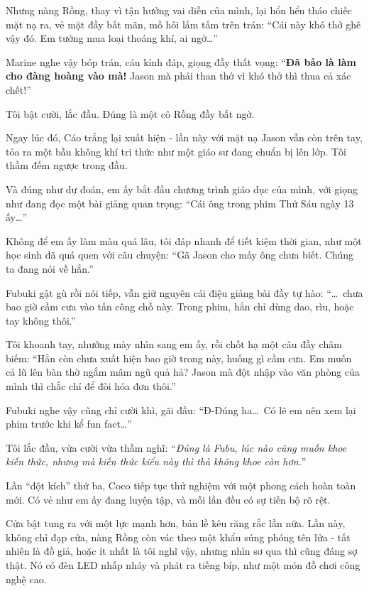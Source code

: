 \documentclass[../main.tex]{subfiles}
\begin{document}
Nhưng nàng Rồng, thay vì tận hưởng vai diễn của mình, lại hổn hển tháo chiếc mặt nạ ra, vẻ mặt đầy bất mãn, mồ hôi lấm tấm trên trán: ``Cái này khó thở ghê vậy đó. Em tưởng mua loại thoáng khí, ai ngờ\dots''

Marine nghe vậy bóp trán, cáu kỉnh đáp, giọng đầy thất vọng: ``\textbf{Đã bảo là làm cho đàng hoàng vào mà!} Jason mà phải than thở vì khó thở thì thua cả xác chết!''

Tôi bật cười, lắc đầu. Đúng là một cô Rồng đầy bất ngờ.

\il

Ngay lúc đó, Cáo trắng lại xuất hiện - lần này với mặt nạ Jason vẫn còn trên tay, tỏa ra một bầu không khí tri thức như một giáo sư đang chuẩn bị lên lớp. Tôi thầm đếm ngược trong đầu.

Và đúng như dự đoán, em ấy bắt đầu chương trình giáo dục của mình, với giọng như đang đọc một bài giảng quan trọng: ``Cái ông trong phim Thứ Sáu ngày 13 ấy\dots''


Không để em ấy làm màu quá lâu, tôi đáp nhanh để tiết kiệm thời gian, như một học sinh đã quá quen với câu chuyện: ``Gã Jason cho mấy ông chưa biết. Chúng ta đang nói về hắn.''

Fubuki gật gù rồi nói tiếp, vẫn giữ nguyên cái điệu giảng bài đầy tự hào: ``\dots\ chưa bao giờ cầm cưa vào tấn công chỗ này. Trong phim, hắn chỉ dùng dao, rìu, hoặc tay không thôi.''

Tôi khoanh tay, nhướng mày nhìn sang em ấy, rồi chốt hạ một câu đầy châm biếm: ``Hắn còn chưa xuất hiện bao giờ trong này, huống gì cầm cưa. Em muốn cả lũ lên bàn thờ ngắm mâm ngũ quả hả? Jason mà đột nhập vào văn phòng của mình thì chắc chỉ để đòi hóa đơn thôi.''

Fubuki nghe vậy cũng chỉ cười khì, gãi đầu: ``Đ-Đúng ha\dots\ Có lẽ em nên xem lại phim trước khi kể fun fact\dots''

Tôi lắc đầu, vừa cười vừa thầm nghĩ: ``\textit{Đúng là Fubu, lúc nào cũng muốn khoe kiến thức, nhưng mà kiến thức kiểu này thì thà không khoe còn hơn.}''

\il

\ct

Lần ``đột kích'' thứ ba, Coco tiếp tục thử nghiệm với một phong cách hoàn toàn mới. Có vẻ như em ấy đang luyện tập, và mỗi lần đều có sự tiến bộ rõ rệt.

Cửa bật tung ra với một lực mạnh hơn, bản lề kêu răng rắc lần nữa. Lần này, không chỉ đạp cửa, nàng Rồng còn vác theo một khẩu súng phóng tên lửa - tất nhiên là đồ giả, hoặc ít nhất là tôi nghĩ vậy, nhưng nhìn sơ qua thì cũng đáng sợ thật. Nó có đèn LED nhấp nháy và phát ra tiếng bíp, như một món đồ chơi công nghệ cao.
\end{document}
